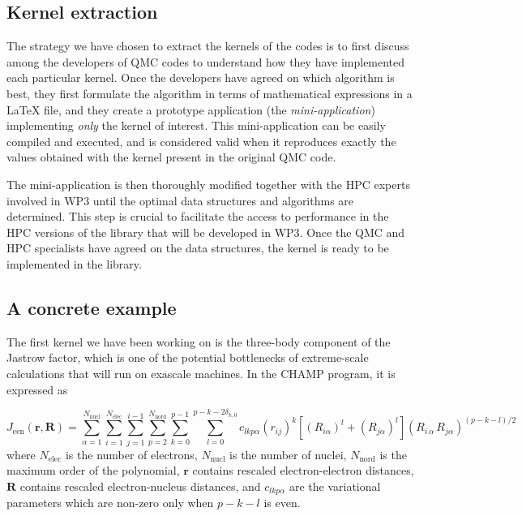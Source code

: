 \subsection{Kernel extraction}

The strategy we have chosen to extract the kernels of the codes is to
first discuss among the developers of \ac{QMC} codes to understand how they have
implemented each particular kernel. Once the developers have agreed on
which algorithm is best, they first formulate the algorithm in terms
of mathematical expressions in a {\LaTeX} file, and they create a prototype application 
(the \emph{mini-application}) implementing \emph{only} the kernel of
interest. This mini-application can be easily compiled and executed,
and is considered valid when it reproduces exactly the values obtained
with the kernel present in the original \ac{QMC} code.

The mini-application is then thoroughly modified together with the
\ac{HPC} experts involved in \ac{WP}3 until the optimal data
structures and algorithms are determined. This step is crucial to
facilitate the access to performance in the \ac{HPC} versions of the
library that will be developed in \ac{WP}3.  Once the \ac{QMC} and
\ac{HPC} specialists have agreed on the data structures, the kernel is
ready to be implemented in the
library.


\subsection{A concrete example}

The first kernel we have been working on is the three-body component of
the Jastrow factor, which is one of the potential bottlenecks of
extreme-scale calculations that will run on exascale machines.
In the CHAMP program, it is expressed as

\newcommand{\Jeen}{J_{\text{een}}}
\newcommand{\Nel}{N_{\text{elec}}}
\newcommand{\Nat}{N_{\text{nucl}}}
\newcommand{\Nord}{N_{\text{nord}}}
\newcommand{\lmax}{p-k-2\delta_{k,0}}
\newcommand{\br}{\mathbf{r}}
\newcommand{\bR}{\mathbf{R}}
\[
  \Jeen (\br,\bR) = \sum_{\alpha=1}^{\Nat} \sum_{i=1}^{\Nel} \sum_{j=1}^{i-1}
\sum_{p=2}^{\Nord} \sum_{k=0}^{p-1}
\sum_{l=0}^{\lmax} c_{lkp\alpha}
\left( {r}_{ij} \right)^k
\left[ \left( {R}_{i\alpha} \right)^l + \left( {R}_{j\alpha} \right)^l \right]
\left( {R}_{i\,\alpha} \, {R}_{j\alpha} \right)^{(p-k-l)/2} 
\]
where
$\Nel$ is the number of electrons, 
$\Nat$ is the number of nuclei,
$\Nord$ is the maximum order of the polynomial, 
$\br$ contains rescaled electron-electron distances, 
$\bR$ contains rescaled electron-nucleus distances,
and $c_{lkp\alpha}$ are the variational parameters which are non-zero
only when $p-k-l$ is even.

